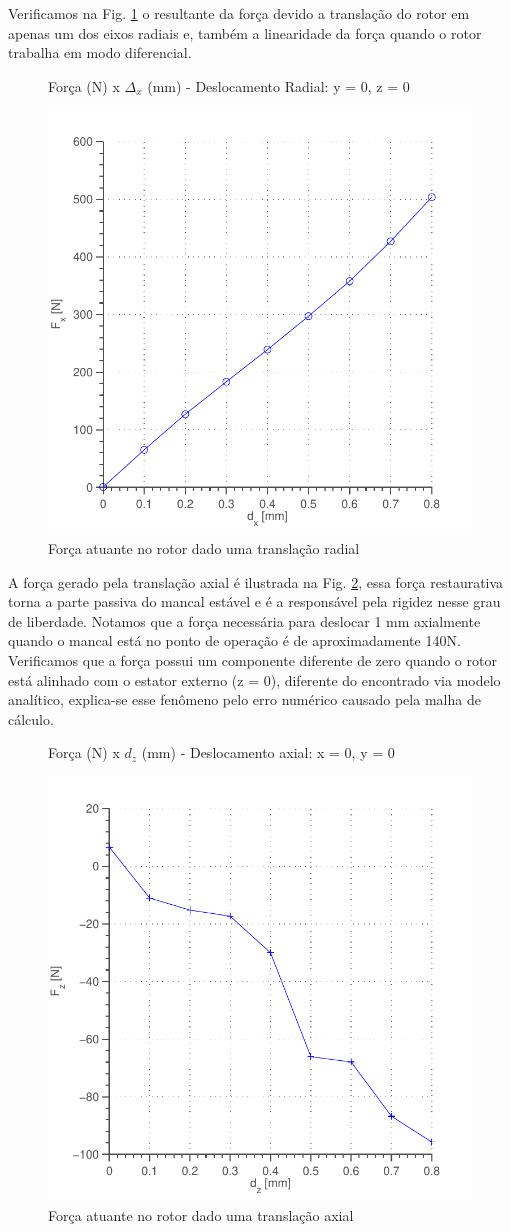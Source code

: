 Verificamos na Fig. \ref{fig:forca:passivo:otimizado:fem:dx} o resultante  da força devido a translação do rotor em apenas um dos eixos radiais e, também a linearidade da força quando o rotor trabalha em modo diferencial.  

\begin{figure}[!ht]
\centering
\caption*{Força (N) x $\Delta_x$ (mm) - Deslocamento Radial: y = 0, z = 0}
\includegraphics[width=0.6 \columnwidth,angle=0]{Figs/Simulacoes/Passivo2/fem/passivo_otimizado_fem_dx}
\caption{Força atuante no rotor dado uma translação radial}
\label{fig:forca:passivo:otimizado:fem:dx}
\end{figure} 

A força gerado pela translação axial é ilustrada na Fig. \ref{fig:forca:passivo:otimizado:fem:dy}, essa força restaurativa torna a parte passiva do mancal estável e é a responsável pela rigidez nesse grau de liberdade. Notamos que a força necessária para deslocar 1 mm axialmente quando o mancal está no ponto de operação é de aproximadamente 140N. Verificamos que a força possui um componente diferente de zero quando o rotor está alinhado com o estator externo (z = 0), diferente do encontrado via  modelo analítico, explica-se esse fenômeno pelo erro numérico causado pela malha de cálculo.

\begin{figure}[!ht]
	\centering
	\caption*{Força (N) x $d_z$ (mm) - Deslocamento axial: x = 0, y = 0}
	\includegraphics[width=0.6 \columnwidth,angle=0]{Figs/Simulacoes/Passivo2/fem/passivo_otimizado_fem_dy}
	\caption{Força atuante no rotor dado uma translação axial}
	\label{fig:forca:passivo:otimizado:fem:dy}
\end{figure}

